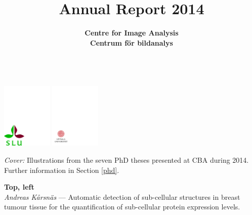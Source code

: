 \documentclass[11pt,twoside,a4paper,titlepage]{article}
\begin{document}
{\begin{titlepage}
\begin{center}
\hspace*{5mm}
\includegraphics[width=0.18\textwidth,viewport=0 -70 269 276, clip]{FRONTIMAGES/SLUco.pdf}
\hfill
\includegraphics[width=0.18\textwidth, bb=35 44 203 203, clip]{FRONTIMAGES/UU_logo_4f_84.pdf}
\end{center}
\end{titlepage}
}

\title{
\thispagestyle{empty}
\bf\Huge
Annual Report 2014
}

\author{
\bf\Huge{Centre for Image Analysis}\\[14mm]
\bf\Huge{Centrum f\"{o}r bildanalys}\\\\
}
\date{}

\thispagestyle{empty}
\maketitle

\thispagestyle{empty}

\newpage

\vspace*{3cm}

\noindent
\emph{Cover:\/} Illustrations from the seven PhD theses presented at CBA during 2014. Further information in Section \ref{phd}.

\vspace*{1cm}

\noindent
{\bf Top, left}\\
\emph{Andreas K{\aa}rsn\"{a}s} --- Automatic detection of sub-cellular structures in breast tumour tissue for the quantification of sub-cellular protein expression levels.

\vspace*{1cm}
\end{document}
